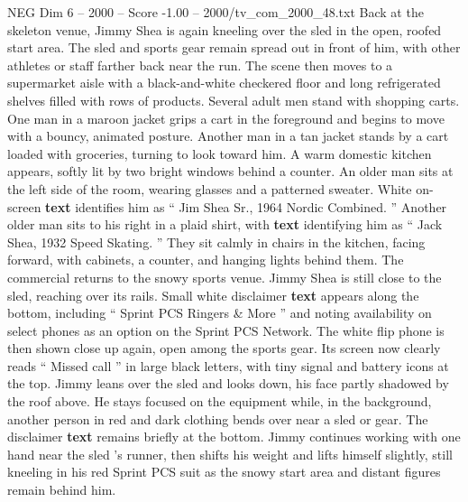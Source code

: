 \begin{textsample}{NEG Dim 6 – 2000 – Score -1.00 – 2000/tv\_com\_2000\_48.txt}
Back at the skeleton venue, Jimmy Shea is again kneeling over the sled in the open, roofed start area.
The sled and sports gear remain spread out in front of him, with other athletes or staff farther back near the run.
The scene then moves to a supermarket aisle with a black-and-white checkered floor and long refrigerated shelves filled with rows of products.
Several adult men stand with shopping carts.
One man in a maroon jacket grips a cart in the foreground and begins to move with a bouncy, animated posture.
Another man in a tan jacket stands by a cart loaded with groceries, turning to look toward him.
A warm domestic kitchen appears, softly lit by two bright windows behind a counter.
An older man sits at the left side of the room, wearing glasses and a patterned sweater.
White on-screen \textbf{text} identifies him as “ Jim Shea Sr., 1964 Nordic Combined. ” Another older man sits to his right in a plaid shirt, with \textbf{text} identifying him as “ Jack Shea, 1932 Speed Skating. ” They sit calmly in chairs in the kitchen, facing forward, with cabinets, a counter, and hanging lights behind them.
The commercial returns to the snowy sports venue.
Jimmy Shea is still close to the sled, reaching over its rails.
Small white disclaimer \textbf{text} appears along the bottom, including “ Sprint PCS Ringers \& More ” and noting availability on select phones as an option on the Sprint PCS Network.
The white flip phone is then shown close up again, open among the sports gear.
Its screen now clearly reads “ Missed call ” in large black letters, with tiny signal and battery icons at the top.
Jimmy leans over the sled and looks down, his face partly shadowed by the roof above.
He stays focused on the equipment while, in the background, another person in red and dark clothing bends over near a sled or gear.
The disclaimer \textbf{text} remains briefly at the bottom.
Jimmy continues working with one hand near the sled ’s runner, then shifts his weight and lifts himself slightly, still kneeling in his red Sprint PCS suit as the snowy start area and distant figures remain behind him.

\end{textsample}
